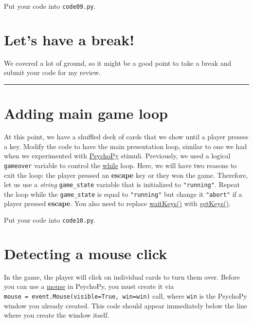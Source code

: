 \documentclass[
]{book}
\begin{document}
Put your code into \texttt{code09.py}.

\hypertarget{lets-have-a-break}{%
\section{Let's have a break!}\label{lets-have-a-break}}

We covered a lot of ground, so it might be a good point to take a break and submit your code for my review.

\begin{center}\rule{0.5\linewidth}{0.5pt}\end{center}

\hypertarget{adding-main-game-loop}{%
\section{Adding main game loop}\label{adding-main-game-loop}}

At this point, we have a shuffled deck of cards that we show until a player presses a key. Modify the code to have the main presentation loop, similar to one we had when we experimented with \protect\hyperlink{psychopy-basics}{PsychoPy} stimuli. Previously, we used a logical \texttt{gameover} variable to control the \protect\hyperlink{ux5cux23while-loop}{while} loop. Here, we will have two reasons to exit the loop: the player pressed an \textbf{escape} key or they won the game. Therefore, let us use a \emph{string} \texttt{game\_state} variable that is initialized to \texttt{"running"}. Repeat the loop while the \texttt{game\_state} is equal to \texttt{"running"} but change it \texttt{"abort"} if a player pressed \textbf{escape}. You also need to replace \href{https://psychopy.org/api/event.html\#psychopy.event.waitKeys}{waitKeys()} with \href{https://psychopy.org/api/event.html\#psychopy.event.getKeys}{getKeys()}.

Put your code into \texttt{code10.py}.

\hypertarget{psychopy-mouse}{%
\section{Detecting a mouse click}\label{psychopy-mouse}}

In the game, the player will click on individual cards to turn them over. Before you can use a \href{https://psychopy.org/api/event.html\#psychopy.event.Mouse}{mouse} in PsychoPy, you must create it via \texttt{mouse\ =\ event.Mouse(visible=True,\ win=win)} call, where \texttt{win} is the PsychoPy window you already created. This code should appear immediately below the line where you create the window itself.
\end{document}
